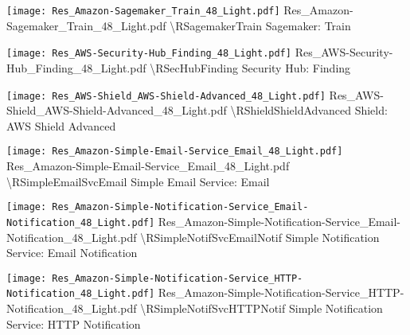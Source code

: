  {\texttt{[image: Res\_Amazon-Sagemaker\_Train\_48\_Light.pdf]}} {Res\_Amazon-Sagemaker\_Train\_48\_Light.pdf} {{\textbackslash}RSagemakerTrain} {Sagemaker: Train}

 {\texttt{[image: Res\_AWS-Security-Hub\_Finding\_48\_Light.pdf]}} {Res\_AWS-Security-Hub\_Finding\_48\_Light.pdf} {{\textbackslash}RSecHubFinding} {Security Hub: Finding}

 {\texttt{[image: Res\_AWS-Shield\_AWS-Shield-Advanced\_48\_Light.pdf]}} {Res\_AWS-Shield\_AWS-Shield-Advanced\_48\_Light.pdf} {{\textbackslash}RShieldShieldAdvanced} {Shield: AWS Shield Advanced}

 {\texttt{[image: Res\_Amazon-Simple-Email-Service\_Email\_48\_Light.pdf]}} {Res\_Amazon-Simple-Email-Service\_Email\_48\_Light.pdf} {{\textbackslash}RSimpleEmailSvcEmail} {Simple Email Service: Email}

 {\texttt{[image: Res\_Amazon-Simple-Notification-Service\_Email-Notification\_48\_Light.pdf]}} {Res\_Amazon-Simple-Notification-Service\_Email-Notification\_48\_Light.pdf} {{\textbackslash}RSimpleNotifSvcEmailNotif} {Simple Notification Service: Email Notification}

 {\texttt{[image: Res\_Amazon-Simple-Notification-Service\_HTTP-Notification\_48\_Light.pdf]}} {Res\_Amazon-Simple-Notification-Service\_HTTP-Notification\_48\_Light.pdf} {{\textbackslash}RSimpleNotifSvcHTTPNotif} {Simple Notification Service: HTTP Notification}


